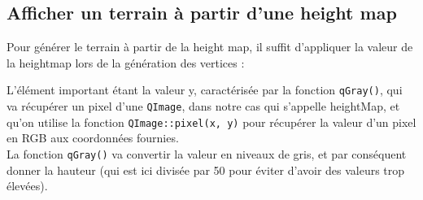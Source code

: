 \documentclass[a4paper,11pt]{report}
\begin{document}
    \subsection{Afficher un terrain à partir d'une height map}
    Pour générer le terrain à partir de la height map, il suffit d'appliquer la valeur de la heightmap lors de la génération des vertices :
        
	L'élément important étant la valeur y, caractérisée par la fonction \texttt{qGray()}, qui va récupérer un pixel d'une \texttt{QImage}, dans notre cas qui s'appelle heightMap, et qu'on utilise la fonction \texttt{QImage::pixel(x, y)} pour récupérer la valeur d'un pixel en RGB aux coordonnées fournies.\\
	La fonction \texttt{qGray()} va convertir la valeur en niveaux de gris, et par conséquent donner la hauteur (qui est ici divisée par 50 pour éviter d'avoir des valeurs trop élevées).
    	
\end{document}
